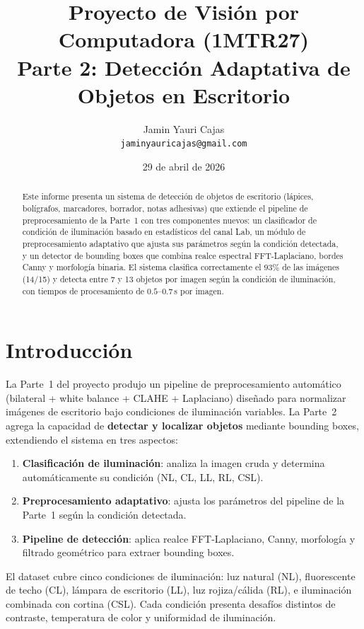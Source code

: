 \documentclass[11pt,a4paper]{article}
\title{
    \vspace{-1.5cm}
    \textbf{Proyecto de Visión por Computadora (1MTR27)} \\[0.3cm]
    \Large Parte 2: Detección Adaptativa de Objetos en Escritorio
}
\author{Jamin Yauri Cajas \\ \texttt{jaminyauricajas@gmail.com}}
\date{29 de abril de 2026}
\begin{document}
\maketitle

\begin{abstract}
\noindent
Este informe presenta un sistema de detección de objetos de escritorio (lápices,
bolígrafos, marcadores, borrador, notas adhesivas) que extiende el pipeline de
preprocesamiento de la Parte~1 con tres componentes nuevos: un clasificador de
condición de iluminación basado en estadísticos del canal Lab, un módulo de
preprocesamiento adaptativo que ajusta sus parámetros según la condición detectada,
y un detector de bounding boxes que combina realce espectral FFT-Laplaciano, bordes
Canny y morfología binaria. El sistema clasifica correctamente el \(93\%\) de las
imágenes (14/15) y detecta entre 7 y 13 objetos por imagen según la condición de
iluminación, con tiempos de procesamiento de $0.5$--$0.7$\,s por imagen.
\end{abstract}

\section{Introducción}
\label{sec:intro}

La Parte~1 del proyecto produjo un pipeline de preprocesamiento automático
(bilateral + white balance + CLAHE + Laplaciano) diseñado para normalizar
imágenes de escritorio bajo condiciones de iluminación variables. La Parte~2
agrega la capacidad de \textbf{detectar y localizar objetos} mediante bounding
boxes, extendiendo el sistema en tres aspectos:

\begin{enumerate}
    \item \textbf{Clasificación de iluminación}: analiza la imagen cruda y determina
          automáticamente su condición (NL, CL, LL, RL, CSL).
    \item \textbf{Preprocesamiento adaptativo}: ajusta los parámetros del pipeline
          de la Parte~1 según la condición detectada.
    \item \textbf{Pipeline de detección}: aplica realce FFT-Laplaciano, Canny,
          morfología y filtrado geométrico para extraer bounding boxes.
\end{enumerate}

El dataset cubre cinco condiciones de iluminación: luz natural (NL), fluorescente
de techo (CL), lámpara de escritorio (LL), luz rojiza/cálida (RL), e iluminación
combinada con cortina (CSL). Cada condición presenta desafíos distintos de
contraste, temperatura de color y uniformidad de iluminación.
\end{document}
